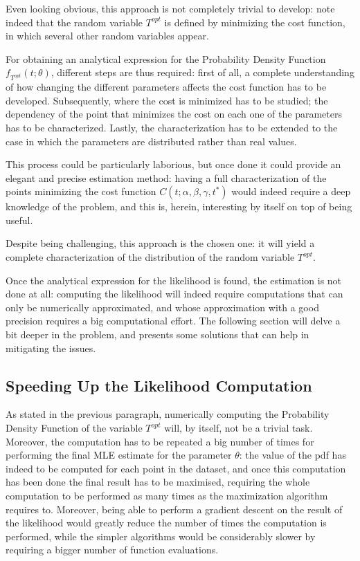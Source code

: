 Even looking obvious, this approach is not completely trivial to develop:
note indeed that the random variable \(T^{opt}\) is defined by minimizing the cost function,
in which several other random variables appear.

For obtaining an analytical expression for the Probability Density Function \(f_{T^{opt}}(t; \theta)\), different steps are thus required:
first of all, a complete understanding of how changing the different parameters affects the cost function has to be developed.
Subsequently, where the cost is minimized has to be studied;
the dependency of the point that minimizes the cost on each one of the parameters has to be characterized.
Lastly, the characterization has to be extended to the case in which the parameters are distributed rather than real values.

This process could be particularly laborious,
but once done it could provide an elegant and precise estimation method:
having a full characterization of the points minimizing the cost function \(C(t; \alpha, \beta, \gamma, t^*)\) would indeed require a deep knowledge of the problem,
and this is, herein, interesting by itself on top of being useful.

Despite being challenging,
this approach is the chosen one:
it will yield a complete characterization of the distribution of the random variable \(T^{opt}\).

Once the analytical expression for the likelihood is found,
the estimation is not done at all:
computing the likelihood will indeed require computations that can only be numerically approximated,
and whose approximation with a good precision requires a big computational effort.
The following section will delve a bit deeper in the problem,
and presents some solutions that can help in mitigating the issues.

\subsection{Speeding Up the Likelihood Computation}
\label{sec:lik_speed}
As stated in the previous paragraph, numerically computing the Probability Density Function of the variable \(T^{opt}\) will,
by itself, not be a trivial task.
Moreover, the computation has to be repeated a big number of times for performing the final MLE estimate for the parameter \(\theta\):
the value of the pdf has indeed to be computed for each point in the dataset,
and once this computation has been done the final result has to be maximised,
requiring the whole computation to be performed as many times as the maximization algorithm requires to.
Moreover, being able to perform a gradient descent on the result of the likelihood would greatly reduce the number of times the computation is performed,
while the simpler algorithms would be considerably slower by requiring a bigger number of function evaluations.

